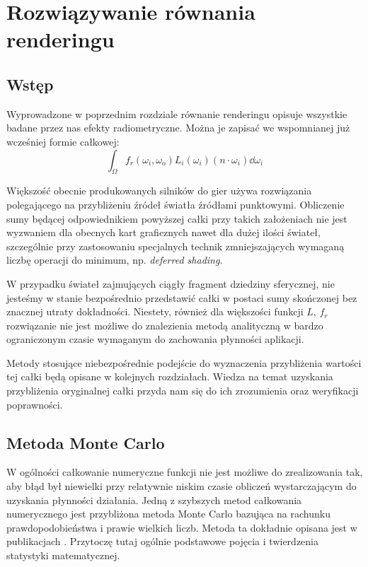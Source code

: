 \documentclass[../main.tex]{subfiles}
\begin{document}
\chapter{Rozwiązywanie równania renderingu}

\section{Wstęp}

Wyprowadzone w poprzednim rozdziale równanie renderingu opisuje wszystkie badane przez nas efekty radiometryczne. Można je zapisać we wspomnianej już wcześniej formie całkowej:
\[
  \int_{\Omega} {
      f_r(\omega_i, \omega_o)
      L_i(\omega_i)
      (n \cdot \omega_i)
      \dd{\omega_i}
  }
\]

Większość obecnie produkowanych silników do gier używa rozwiązania polegającego na przybliżeniu źródeł światła źródłami punktowymi. Obliczenie sumy będącej odpowiednikiem powyższej całki przy takich założeniach nie jest wyzwaniem dla obecnych kart graficznych nawet dla dużej ilości świateł, szczególnie przy zastosowaniu specjalnych technik zmniejszających wymaganą liczbę operacji do minimum, np. \textit{deferred shading}.

W przypadku świateł zajmujących ciągły fragment dziedziny sferycznej, nie jesteśmy w stanie bezpośrednio przedstawić całki w postaci sumy skończonej bez znacznej utraty dokładności. Niestety, również dla większości funkcji $L$, $f_r$ rozwiązanie nie jest możliwe do znalezienia metodą analityczną w bardzo ograniczonym czasie wymaganym do zachowania płynności aplikacji.

Metody stosujące niebezpośrednie podejście do wyznaczenia przybliżenia wartości tej całki będą opisane w kolejnych rozdziałach. Wiedza na temat uzyskania przybliżenia oryginalnej całki przyda nam się do ich zrozumienia oraz weryfikacji poprawności.

\section{Metoda Monte Carlo}

W ogólności całkowanie numeryczne funkcji nie jest możliwe do zrealizowania tak, aby błąd był niewielki przy relatywnie niskim czasie obliczeń wystarczającym do uzyskania płynności działania. Jedną z szybszych metod całkowania numerycznego jest przybliżona metoda Monte Carlo bazująca na rachunku prawdopodobieństwa i prawie wielkich liczb. Metoda ta dokładnie opisana jest w publikacjach \cite{Sierocinski,MonteCarloAnderson,Veach}. Przytoczę tutaj ogólnie podstawowe pojęcia i twierdzenia statystyki matematycznej.
\end{document}

